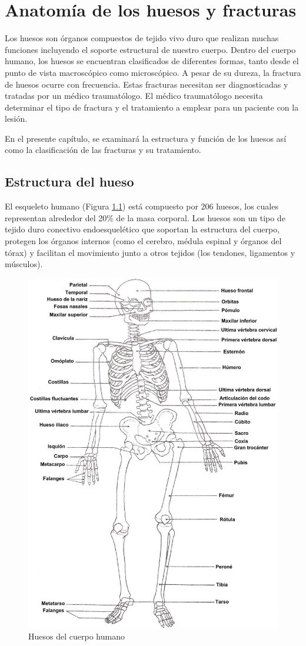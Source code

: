 
\chapter{Anatom\'ia de los huesos y fracturas}

Los huesos son \'organos compuestos de tejido vivo duro que realizan muchas funciones incluyendo el soporte estructural de nuestro cuerpo. Dentro del cuerpo humano, los huesos se encuentran clasificados de diferentes formas, tanto desde el punto de vista macrosc\'opico como microsc\'opico. A pesar de su dureza, la fractura de huesos ocurre con frecuencia. Estas fracturas necesitan ser diagnosticadas y tratadas por un m\'edico traumat\'ologo. El m\'edico traumat\'ologo necesita determinar el tipo de fractura y el tratamiento a emplear para un paciente con la lesi\'on.

En el presente cap\'itulo, se examinar\'a la estructura y funci\'on de los huesos as\'i como la clasificaci\'on de las fracturas y su tratamiento.

\section{Estructura del hueso}

El esqueleto humano (Figura \ref{fig:skeleton}) est\'a compuesto por 206 huesos, los cuales representan alrededor del 20\% de la masa corporal. Los huesos son un tipo de tejido duro conectivo endoesquel\'etico que soportan la estructura del cuerpo, protegen los \'organos internos (como el cerebro, m\'edula espinal y \'organos del t\'orax) y facilitan el movimiento junto a otros tejidos (los tendones, ligamentos y m\'usculos).
\begin{figure}[htb]
	\centering
		\includegraphics[width=0.35\columnwidth]{images/skeleton.png}
		\caption{Huesos del cuerpo humano}
	\label{fig:skeleton}
\end{figure}

